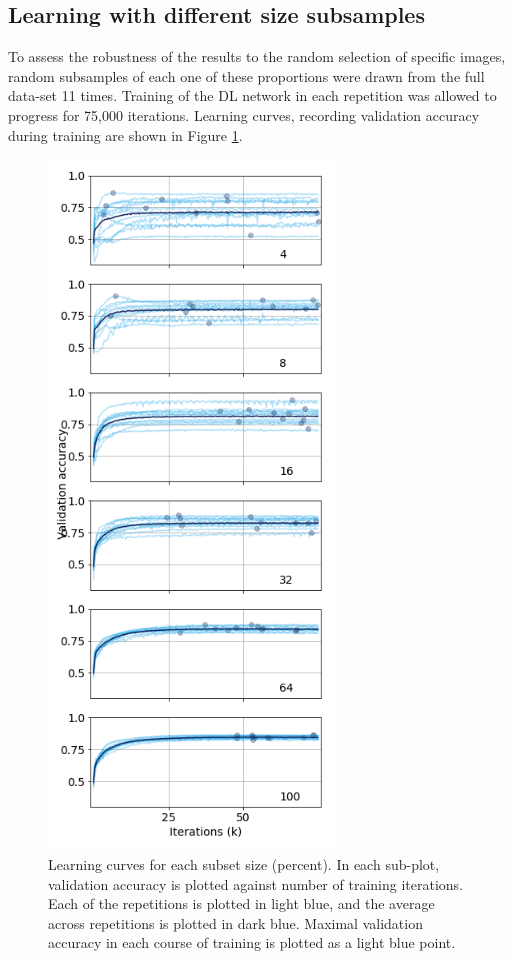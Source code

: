 \subsection{Learning with different size subsamples}

To assess the robustness of the results to the random selection of specific
images, random subsamples of each one of these proportions were drawn from the
full data-set 11 times. Training of the DL network in each repetition was
allowed to progress for 75,000 iterations. Learning curves, recording validation
accuracy during training are shown in Figure \ref{fig_learning_curves}.

\begin{figure}[!t]
\centering
\includegraphics[width=3in]{./figures/learning}

\caption{Learning curves for each subset size (percent). In each sub-plot,
validation accuracy is plotted against number of training iterations. Each of
the repetitions is plotted in light blue, and the average across repetitions is
plotted in dark blue. Maximal validation accuracy in each course of training is
plotted as a light blue point.}

\label{fig_learning_curves}
\end{figure}

